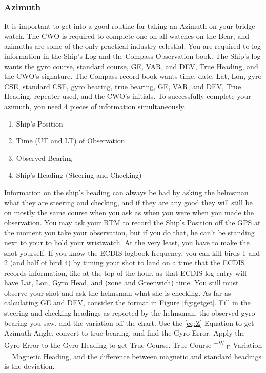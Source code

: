 \documentclass[letterpaper,12pt]{article}
\begin{document}
\subsubsection{Azimuth} \label{doubleget}
It is important to get into a good routine for taking an Azimuth on your bridge watch.
The CWO is required to complete one on all watches on the Bear, and azimuths are some of the only practical industry celestial.
You are required to log information in the Ship's Log and the Compass Observation book.
The Ship's log wants the gyro course, standard course, GE, VAR, and DEV, True Heading, and the CWO's signature.
The Compass record book wants time, date, Lat, Lon, gyro CSE, standard CSE, gyro bearing, true bearing, GE, VAR, and DEV, True Heading, repeater used, and the CWO's initials.
To successfully complete your azimuth, you need 4 pieces of information simultaneously.
\begin{enumerate}
	\item Ship's Position
	\item Time (UT and LT) of Observation
	\item Observed Bearing
	\item Ship's Heading (Steering and Checking)
\end{enumerate}
Information on the ship's heading can always be had by asking the helmsman what they are steering and checking, and if they are any good they will still be on mostly the same course when you ask as when you were when you made the observation.
You may ask your BTM to record the Ship's Position off the GPS at the moment you take your observation, but if you do that, he can't be standing next to your to hold your wristwatch.
At the very least, you have to make the shot yourself.
If you know the ECDIS logbook frequency, you can kill birds 1 and 2 (and half of bird 4) by timing your shot to land on a time that the ECDIS records information, like at the top of the hour, as that ECDIS log entry will have Lat, Lon, Gyro Head, and (zone and Greenwich) time.
You still must observe your shot and ask the helmsman what she is checking.
As far as calculating GE and DEV, consider the format in Figure \ref{fig:getget}.
Fill in the steering and checking headings as reported by the helmsman, the observed gyro bearing you saw, and the variation off the chart.
Use the \ref{eq:Z} Equation to get Azimuth Angle, convert to true bearing, and find the Gyro Error.
Apply the Gyro Error to the Gyro Heading to get True Course. 
True Course \textsuperscript{+W}\textsubscript{-E} Variation = Magnetic Heading, and the difference between magnetic and standard headings is the deviation.
\end{document}
